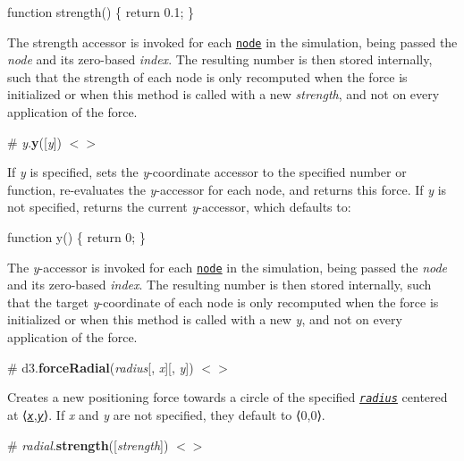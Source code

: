\begin{DoxyCode}
function strength() \{
  return 0.1;
\}
\end{DoxyCode}


The strength accessor is invoked for each \href{#simulation_nodes}{\tt node} in the simulation, being passed the {\itshape node} and its zero-\/based {\itshape index}. The resulting number is then stored internally, such that the strength of each node is only recomputed when the force is initialized or when this method is called with a new {\itshape strength}, and not on every application of the force.

\label{_y_y}%
\# {\itshape y}.{\bfseries y}(\mbox{[}{\itshape y}\mbox{]}) \href{https://github.com/d3/d3-force/blob/master/src/y.js#L36}{\tt $<$$>$}

If {\itshape y} is specified, sets the {\itshape y}-\/coordinate accessor to the specified number or function, re-\/evaluates the {\itshape y}-\/accessor for each node, and returns this force. If {\itshape y} is not specified, returns the current {\itshape y}-\/accessor, which defaults to\+:


\begin{DoxyCode}
function y() \{
  return 0;
\}
\end{DoxyCode}


The {\itshape y}-\/accessor is invoked for each \href{#simulation_nodes}{\tt node} in the simulation, being passed the {\itshape node} and its zero-\/based {\itshape index}. The resulting number is then stored internally, such that the target {\itshape y}-\/coordinate of each node is only recomputed when the force is initialized or when this method is called with a new {\itshape y}, and not on every application of the force.

\label{_forceRadial}%
\# d3.{\bfseries force\+Radial}({\itshape radius}\mbox{[}, {\itshape x}\mbox{]}\mbox{[}, {\itshape y}\mbox{]}) \href{https://github.com/d3/d3-force/blob/master/src/radial.js}{\tt $<$$>$}

Creates a new positioning force towards a circle of the specified \href{#radial_radius}{\tt {\itshape radius}} centered at ⟨\href{#radial_x}{\tt {\itshape x}},\href{#radial_y}{\tt {\itshape y}}⟩. If {\itshape x} and {\itshape y} are not specified, they default to ⟨0,0⟩.

\label{_radial_strength}%
\# {\itshape radial}.{\bfseries strength}(\mbox{[}{\itshape strength}\mbox{]}) \href{https://github.com/d3/d3-force/blob/master/src/radial.js}{\tt $<$$>$}


